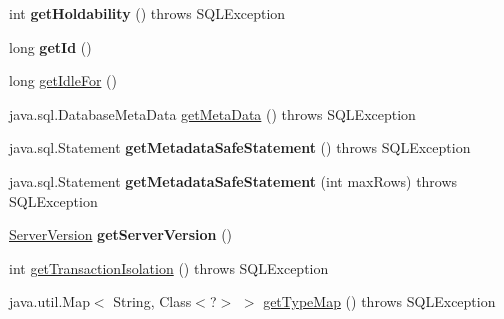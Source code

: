 \begin{DoxyCompactItemize}
\mbox{\label{classcom_1_1mysql_1_1cj_1_1jdbc_1_1_connection_impl_ad99dbc456dfcebbb7fc11f100893ca56}} 
int {\bfseries get\+Holdability} ()  throws S\+Q\+L\+Exception 
\item 
\mbox{\label{classcom_1_1mysql_1_1cj_1_1jdbc_1_1_connection_impl_ae835f7c80a3c9705b622a244ba07e7e3}} 
long {\bfseries get\+Id} ()
\item 
long \mbox{\hyperlink{classcom_1_1mysql_1_1cj_1_1jdbc_1_1_connection_impl_a628961d1155b35d0582a3198c2a6bb83}{get\+Idle\+For}} ()
\item 
java.\+sql.\+Database\+Meta\+Data \mbox{\hyperlink{classcom_1_1mysql_1_1cj_1_1jdbc_1_1_connection_impl_acece4c22f0678d1b70d487c8658f1d49}{get\+Meta\+Data}} ()  throws S\+Q\+L\+Exception 
\item 
\mbox{\label{classcom_1_1mysql_1_1cj_1_1jdbc_1_1_connection_impl_a66f6e72ea3c8a1db920f4fe5f736b4c9}} 
java.\+sql.\+Statement {\bfseries get\+Metadata\+Safe\+Statement} ()  throws S\+Q\+L\+Exception 
\item 
\mbox{\label{classcom_1_1mysql_1_1cj_1_1jdbc_1_1_connection_impl_ae2f79574cde7e93df85c06f092230bc8}} 
java.\+sql.\+Statement {\bfseries get\+Metadata\+Safe\+Statement} (int max\+Rows)  throws S\+Q\+L\+Exception 
\item 
\mbox{\label{classcom_1_1mysql_1_1cj_1_1jdbc_1_1_connection_impl_a9267b762c7ea6995bef16e7fa28a8eaf}} 
\mbox{\hyperlink{classcom_1_1mysql_1_1cj_1_1_server_version}{Server\+Version}} {\bfseries get\+Server\+Version} ()
\item 
int \mbox{\hyperlink{classcom_1_1mysql_1_1cj_1_1jdbc_1_1_connection_impl_aa92a66e7ffd147ccf70a80fb47601760}{get\+Transaction\+Isolation}} ()  throws S\+Q\+L\+Exception 
\item 
java.\+util.\+Map$<$ String, Class$<$?$>$ $>$ \mbox{\hyperlink{classcom_1_1mysql_1_1cj_1_1jdbc_1_1_connection_impl_a9960d23d0f9d8c6990c184e0a3e3630c}{get\+Type\+Map}} ()  throws S\+Q\+L\+Exception 
\item 
\mbox{\label{classcom_1_1mysql_1_1cj_1_1jdbc_1_1_connection_impl_a098f1e77842e56a64fad3854686fbe8a}} 

\end{DoxyCompactItemize}
